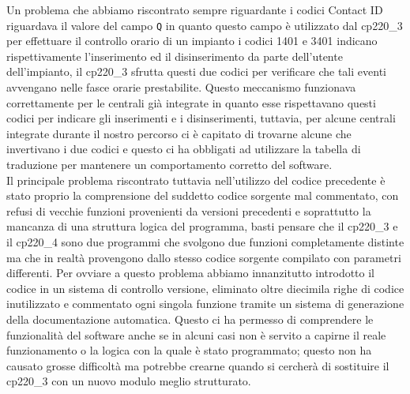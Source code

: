 Un problema che abbiamo riscontrato sempre riguardante i codici Contact ID riguardava il valore del campo \texttt{Q} in quanto questo campo è utilizzato dal cp220\_3 per effettuare il controllo orario di un impianto i codici 1401 e 3401 indicano rispettivamente l'inserimento ed il disinserimento da parte dell'utente dell'impianto, il cp220\_3 sfrutta questi due codici per verificare che tali eventi avvengano nelle fasce orarie prestabilite. Questo meccanismo funzionava correttamente per le centrali già integrate in quanto esse rispettavano questi codici per indicare gli inserimenti e i disinserimenti, tuttavia, per alcune centrali integrate durante il nostro percorso ci è capitato di trovarne alcune che invertivano i due codici e questo ci ha obbligati ad utilizzare la tabella di traduzione per mantenere un comportamento corretto del software.\\
Il principale problema riscontrato tuttavia nell'utilizzo del codice precedente è stato proprio la comprensione del suddetto codice sorgente mal commentato, con refusi  di vecchie funzioni provenienti da versioni precedenti e soprattutto la mancanza di una struttura logica del programma, basti pensare che il cp220\_3 e il cp220\_4 sono due programmi che svolgono due funzioni completamente distinte ma che in realtà provengono dallo stesso codice sorgente compilato con parametri differenti. Per ovviare a questo problema abbiamo innanzitutto introdotto il codice in un sistema di controllo versione, eliminato oltre diecimila righe di codice inutilizzato e commentato ogni singola funzione tramite un sistema di generazione della documentazione automatica. Questo ci ha permesso di comprendere le funzionalità del software anche se in alcuni casi non è servito a capirne il reale funzionamento o la logica con la quale è stato programmato; questo non ha causato grosse difficoltà ma potrebbe crearne quando si cercherà di sostituire il cp220\_3 con un nuovo modulo meglio strutturato.


